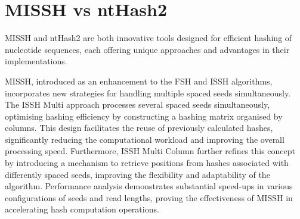 \section{MISSH vs ntHash2}
\label{sec:confronto_MISSH_ntHash2}

\acs{MISSH} and ntHash2 are both innovative tools designed for efficient hashing of nucleotide sequences, each offering unique approaches and advantages in their implementations.

\acs{MISSH}, introduced as an enhancement to the FSH and \acs{ISSH} algorithms, incorporates new strategies for handling multiple spaced seeds simultaneously. The ISSH Multi approach processes several spaced seeds simultaneously, optimising hashing efficiency by constructing a hashing matrix organised by columns. This design facilitates the reuse of previously calculated hashes, significantly reducing the computational workload and improving the overall processing speed. Furthermore, ISSH Multi Column further refines this concept by introducing a mechanism to retrieve positions from hashes associated with differently spaced seeds, improving the flexibility and adaptability of the algorithm. Performance analysis demonstrates substantial speed-ups in various configurations of seeds and read lengths, proving the effectiveness of \acs{MISSH} in accelerating hash computation operations.

